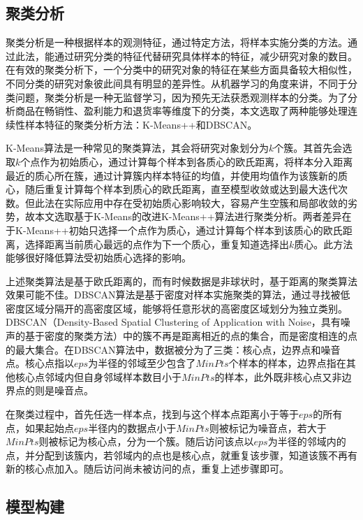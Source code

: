\documentclass[lang=cn,11pt,a4paper,cite=authoryear]{elegantpaper}
\begin{document}
\subsection{聚类分析}

聚类分析是一种根据样本的观测特征，通过特定方法，将样本实施分类的方法。通过此法，能通过研究分类的特征代替研究具体样本的特征，减少研究对象的数目。在有效的聚类分析下，一个分类中的研究对象的特征在某些方面具备较大相似性，不同分类的研究对象彼此间具有明显的差异性。从机器学习的角度来讲，不同于分类问题，聚类分析是一种无监督学习，因为预先无法获悉观测样本的分类。为了分析商品在畅销性、盈利能力和退货率等维度下的分类，本文选取了两种能够处理连续性样本特征的聚类分析方法：K-Means++和DBSCAN。

K-Means算法是一种常见的聚类算法，其会将研究对象划分为$k$个簇。其首先会选取$k$个点作为初始质心，通过计算每个样本到各质心的欧氏距离，将样本分入距离最近的质心所在簇，通过计算簇内样本特征的均值，并使用均值作为该簇新的质心，随后重复计算每个样本到质心的欧氏距离，直至模型收敛或达到最大迭代次数。但此法在实际应用中存在受初始质心影响较大，容易产生空簇和局部收敛的劣势，故本文选取基于K-Means的改进K-Means++算法进行聚类分析。两者差异在于K-Means++初始只选择一个点作为质心，通过计算每个样本到该质心的欧氏距离，选择距离当前质心最远的点作为下一个质心，重复知道选择出$k$质心。此方法能够很好降低算法受初始质心选择的影响。

上述聚类算法是基于欧氏距离的，而有时候数据是非球状时，基于距离的聚类算法效果可能不佳。DBSCAN算法是基于密度对样本实施聚类的算法，通过寻找被低密度区域分隔开的高密度区域，能够将任意形状的高密度区域划分为独立类别。DBSCAN（Density-Based Spatial Clustering of Application with Noise，具有噪声的基于密度的聚类方法）中的簇不再是距离相近的点的集合，而是密度相连的点的最大集合。在DBSCAN算法中，数据被分为了三类：核心点，边界点和噪音点。核心点指以$eps$为半径的邻域至少包含了$MinPts$个样本的样本，边界点指在其他核心点邻域内但自身邻域样本数目小于$MinPts$的样本，此外既非核心点又非边界点的则是噪音点。

在聚类过程中，首先任选一样本点，找到与这个样本点距离小于等于$eps$的所有点，如果起始点$eps$半径内的数据点小于$MinPts$则被标记为噪音点，若大于$MinPts$则被标记为核心点，分为一个簇。随后访问该点以$eps$为半径的邻域内的点，并分配到该簇内，若邻域内的点也是核心点，就重复该步骤，知道该簇不再有新的核心点加入。随后访问尚未被访问的点，重复上述步骤即可。

\subsection{模型构建}
\end{document}
